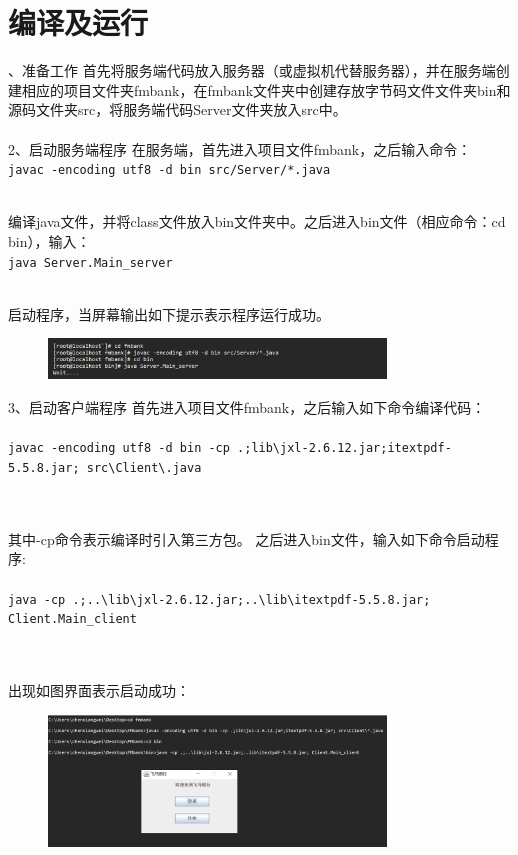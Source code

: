 \section{编译及运行}
、准备工作
首先将服务端代码放入服务器（或虚拟机代替服务器），并在服务端创建相应的项目文件夹fmbank，在fmbank文件夹中创建存放字节码文件文件夹bin和源码文件夹src，将服务端代码Server文件夹放入src中。
\\\\
2、启动服务端程序
在服务端，首先进入项目文件fmbank，之后输入命令：
\\
\begin{adjustbox}{minipage=\linewidth, margin=0pt 0pt 2cm 0pt}
	\texttt{javac -encoding utf8 -d bin src/Server/*.java}
\end{adjustbox}
\\
编译java文件，并将class文件放入bin文件夹中。之后进入bin文件（相应命令：cd bin），输入：
\\
\begin{adjustbox}{minipage=\linewidth, margin=0pt 0pt 2cm 0pt}
	\texttt{java Server.Main\_server}
\end{adjustbox}
\\
启动程序，当屏幕输出如下提示表示程序运行成功。
\begin{figure}[htbp]
	\centering
	\includegraphics[width=0.8\textwidth]{figure/图1}
	\label{fig:example}
\end{figure}
3、启动客户端程序
首先进入项目文件fmbank，之后输入如下命令编译代码：
\\\\
\begin{adjustbox}{minipage=\linewidth, margin=0pt 0pt 2cm 0pt}
	\texttt{javac -encoding utf8 -d bin -cp .;lib\textbackslash jxl-2.6.12.jar;itextpdf-5.5.8.jar; src\textbackslash*Client\textbackslash*.java}
\end{adjustbox}
\\\\
其中-cp命令表示编译时引入第三方包。
之后进入bin文件，输入如下命令启动程序:
\\\\
\begin{adjustbox}{minipage=\linewidth, margin=0pt 0pt 2cm 0pt}
	\texttt{java -cp .;..\textbackslash lib\textbackslash jxl-2.6.12.jar;..\textbackslash lib\textbackslash itextpdf-5.5.8.jar; Client.Main\_client}
\end{adjustbox}
\\\\
出现如图界面表示启动成功：
\begin{figure}
	\centering
	\includegraphics[width=0.8\textwidth]{figure/图2}
	\label{fig:example}
\end{figure}
\newpage
